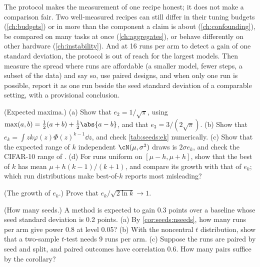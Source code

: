 \begin{refsection}
The protocol makes the measurement of one recipe honest; it does not make a comparison fair. Two well-measured recipes can still differ in their tuning budgets (\cref{ch:budgets}) or in more than the component a claim is about (\cref{ch:confounding}), be compared on many tasks at once (\cref{ch:aggregates}), or behave differently on other hardware (\cref{ch:instability}). And at 16 runs per arm to detect a gain of one standard deviation, the protocol is out of reach for the largest models. Then measure the spread where runs are affordable (a smaller model, fewer steps, a subset of the data) and say so, use paired designs, and when only one run is possible, report it as one run beside the seed standard deviation of a comparable setting, with a provisional conclusion.

\begin{exercises}
\item \consolidation (Expected maxima.) (a) Show that $e_2=1/\sqrt\pi$, using $\max(a,b)=\frac12(a+b)+\frac12\abs{a-b}$, and that $e_3=3/(2\sqrt\pi)$. (b) Show that $e_k=\int zk\varphi(z)\Phi(z)^{k-1}\dd z$, and check \cref{tab:seeds:ek} numerically. (c) Show that the expected range of $k$ independent $\cN(\mu,\sigma^2)$ draws is $2\sigma e_k$, and check the CIFAR-10 range of \textcite{Picard2021}. (d) For runs uniform on $[\mu-h,\mu+h]$, show that the best of $k$ has mean $\mu+h(k-1)/(k+1)$, and compare its growth with that of $e_k$; which run distributions make best-of-$k$ reports most misleading? \label{ex:seeds:ek}

\item \consolidation\hard (The growth of $e_k$.) Prove that $e_k/\sqrt{2\ln k}\to1$. \label{ex:seeds:growth}

\item \consolidation (How many seeds.) A method is expected to gain 0.3 points over a baseline whose seed standard deviation is 0.2 points. (a) By \cref{cor:seeds:nseeds}, how many runs per arm give power 0.8 at level 0.05? (b) With the noncentral $t$ distribution, show that a two-sample $t$-test needs 9 runs per arm. (c) Suppose the runs are paired by seed and split, and paired outcomes have correlation 0.6. How many pairs suffice by the corollary?\label{ex:seeds:howmany}


\end{exercises}
\end{refsection}

